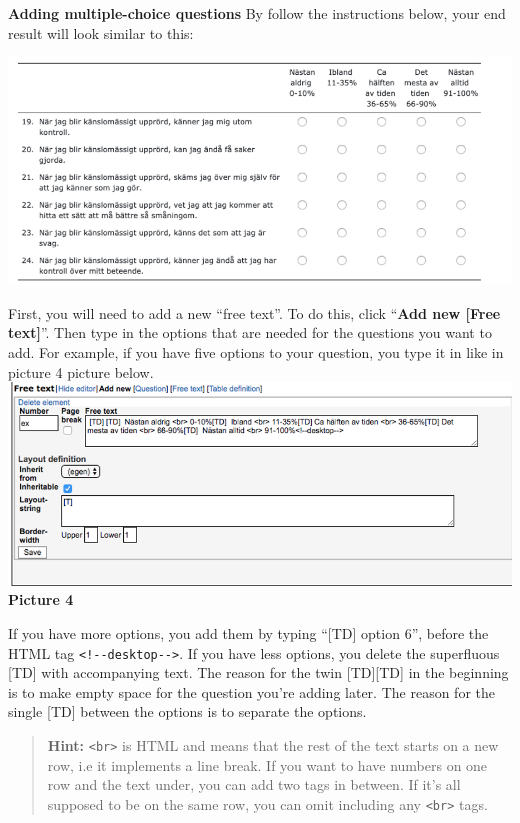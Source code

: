 \documentclass[]{book}
\begin{document}
\textbf{Adding multiple-choice questions}
By follow the instructions below, your end result will look similar to this:

\includegraphics{images/new-images/multiplechoiceQ.png}

First, you will need to add a new ``free text''. To do this, click ``\textbf{Add new {[}Free text{]}}''. Then type in the options that are needed for the questions you want to add. For example, if you have five options to your question, you type it in like in picture 4 picture below.
\includegraphics{images/new-images/multiplechoiceFreeText.png}
\textbf{Picture 4}

If you have more options, you add them by typing ``{[}TD{]} option 6'', before the HTML tag \texttt{\textless{}!-\/-desktop-\/-\textgreater{}}. If you have less options, you delete the superfluous {[}TD{]} with accompanying text. The reason for the twin {[}TD{]}{[}TD{]} in the beginning is to make empty space for the question you're adding later. The reason for the single {[}TD{]} between the options is to separate the options.

\begin{quote}
\textbf{Hint:} \texttt{\textless{}br\textgreater{}} is HTML and means that the rest of the text starts on a new row, i.e it implements a line break. If you want to have numbers on one row and the text under, you can add two tags in between. If it's all supposed to be on the same row, you can omit including any \texttt{\textless{}br\textgreater{}} tags.
\end{quote}
\end{document}
